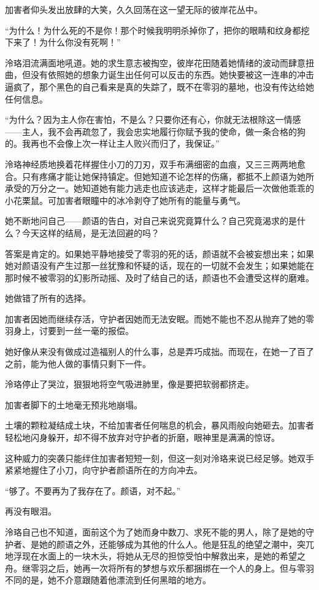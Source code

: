 \documentclass[UTF8, scheme = chinese, openany]{ctexbook}
\begin{document}
加害者仰头发出放肆的大笑，久久回荡在这一望无际的彼岸花丛中。

\vspace{1.5em}

“为什么！为什么死的不是你！那个时候我明明杀掉你了，把你的眼睛和纹身都挖下来了！为什么你没有死啊！”

泠珞泪流满面地吼道。她的求生意志被掏空，彼岸花田随着她情绪的波动而肆意扭曲，但没有依照她的想象力诞生出任何可以反击的东西。她快要被这一连串的冲击逼疯了，那个黑色的自己看来是真的失踪了，既不在零羽的墓地，也没有传达给她任何信息。

“为什么？因为主人你在害怕，不是么？只要你还有心，你就无法根除这一情感——主人，我不会再疏忽了，我会忠实地履行你赋予我的使命，做一条合格的狗的。我再也不会像上次一样让主人败兴而归了，我保证。”

泠珞神经质地换着花样握住小刀的刀刃，双手布满细密的血痕，又三三两两地愈合。只有疼痛才能让她保持镇定。但她知道不论怎样的伤痛，都抵不上颜语为她所承受的万分之一。她知道她有能力逃走也应该逃走，这样才能最后一次做他乖乖的小花栗鼠。可加害者眼瞳中的冰冷剥夺了她所有的能量与勇气。

她不断地问自己——颜语的告白，对自己来说究竟算什么？自己究竟渴求的是什么？今天这样的结局，是无法回避的吗？

答案是肯定的。如果她平静地接受了零羽的死的话，颜语就不会被妄想出来；如果她对颜语没有产生过那一丝犹豫和怀疑的话，现在的一切就不会发生；如果她能在那时候不被零羽的幻影所动摇、及时了结自己的话，颜语也不会遭受这样的磨难。

她做错了所有的选择。

加害者因她而继续存活，守护者因她而无法安眠。而她不能也不忍从抛弃了她的零羽身上，讨要到一丝一毫的报偿。

她好像从来没有做成过造福别人的什么事，总是弄巧成拙。而现在，在她一了百了之前，能为他人做的事情只剩下一件。

泠珞停止了哭泣，狠狠地将空气吸进肺里，像是要把软弱都挤走。

加害者脚下的土地毫无预兆地崩塌。

土壤的颗粒凝结成土块，不给加害者任何喘息的机会，暴风雨般向她砸去。加害者轻松地闪身躲开，却不得不放弃对守护者的折磨，眼神里是满满的惊讶。

这种威力的突袭只能绊住加害者短短一刻，但这一刻对泠珞来说已经足够。她双手紧紧地握住了小刀，向守护者颜语所在的方向冲去。

“够了。不要再为了我存在了。颜语，对不起。”

再没有眼泪。

泠珞自己也不知道，面前这个为了她而身中数刀、求死不能的男人，除了是她的守护者、是她的颜语之外，还能够成为其他的什么人。他是狂乱的绝望之潮中，突兀地浮现在水面上的一块木头，将她从无尽的担惊受怕中解救出来，是她的希望之舟。继零羽之后，她再一次将所有的梦想与欢乐都捆绑在一个人的身上。但与零羽不同的是，她不介意跟随着他漂流到任何黑暗的地方。
\end{document}
